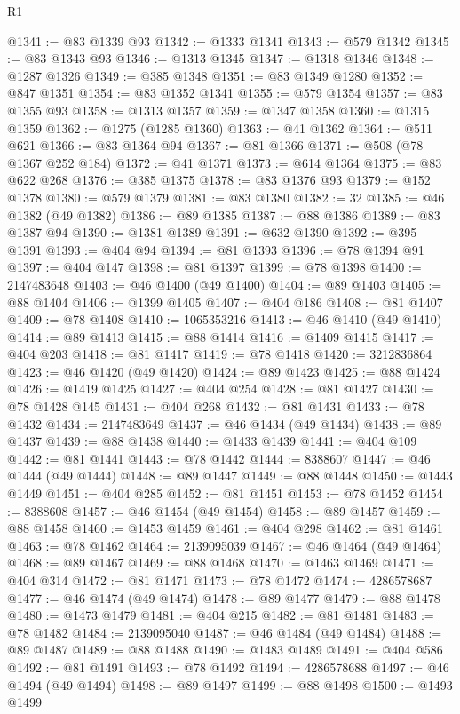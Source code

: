 \begin{lexlean}{R1}
\begin{coremodule}
@1341 := @83 @1339 @93
@1342 := @1333 @1341
@1343 := @579 @1342
@1345 := @83 @1343 @93
@1346 := @1313 @1345
@1347 := @1318 @1346
@1348 := @1287 @1326
@1349 := @385 @1348
@1351 := @83 @1349 @1280
@1352 := @847 @1351
@1354 := @83 @1352 @1341
@1355 := @579 @1354
@1357 := @83 @1355 @93
@1358 := @1313 @1357
@1359 := @1347 @1358
@1360 := @1315 @1359
@1362 := @1275 (@1285 @1360)
@1363 := @41 @1362
@1364 := @511 @621
@1366 := @83 @1364 @94
@1367 := @81 @1366
@1371 := @508 (@78 @1367 @252 @184)
@1372 := @41 @1371
@1373 := @614 @1364
@1375 := @83 @622 @268
@1376 := @385 @1375
@1378 := @83 @1376 @93
@1379 := @152 @1378
@1380 := @579 @1379
@1381 := @83 @1380
@1382 := 32
@1385 := @46 @1382 (@49 @1382)
@1386 := @89 @1385
@1387 := @88 @1386
@1389 := @83 @1387 @94
@1390 := @1381 @1389
@1391 := @632 @1390
@1392 := @395 @1391
@1393 := @404 @94
@1394 := @81 @1393
@1396 := @78 @1394 @91
@1397 := @404 @147
@1398 := @81 @1397
@1399 := @78 @1398
@1400 := 2147483648
@1403 := @46 @1400 (@49 @1400)
@1404 := @89 @1403
@1405 := @88 @1404
@1406 := @1399 @1405
@1407 := @404 @186
@1408 := @81 @1407
@1409 := @78 @1408
@1410 := 1065353216
@1413 := @46 @1410 (@49 @1410)
@1414 := @89 @1413
@1415 := @88 @1414
@1416 := @1409 @1415
@1417 := @404 @203
@1418 := @81 @1417
@1419 := @78 @1418
@1420 := 3212836864
@1423 := @46 @1420 (@49 @1420)
@1424 := @89 @1423
@1425 := @88 @1424
@1426 := @1419 @1425
@1427 := @404 @254
@1428 := @81 @1427
@1430 := @78 @1428 @145
@1431 := @404 @268
@1432 := @81 @1431
@1433 := @78 @1432
@1434 := 2147483649
@1437 := @46 @1434 (@49 @1434)
@1438 := @89 @1437
@1439 := @88 @1438
@1440 := @1433 @1439
@1441 := @404 @109
@1442 := @81 @1441
@1443 := @78 @1442
@1444 := 8388607
@1447 := @46 @1444 (@49 @1444)
@1448 := @89 @1447
@1449 := @88 @1448
@1450 := @1443 @1449
@1451 := @404 @285
@1452 := @81 @1451
@1453 := @78 @1452
@1454 := 8388608
@1457 := @46 @1454 (@49 @1454)
@1458 := @89 @1457
@1459 := @88 @1458
@1460 := @1453 @1459
@1461 := @404 @298
@1462 := @81 @1461
@1463 := @78 @1462
@1464 := 2139095039
@1467 := @46 @1464 (@49 @1464)
@1468 := @89 @1467
@1469 := @88 @1468
@1470 := @1463 @1469
@1471 := @404 @314
@1472 := @81 @1471
@1473 := @78 @1472
@1474 := 4286578687
@1477 := @46 @1474 (@49 @1474)
@1478 := @89 @1477
@1479 := @88 @1478
@1480 := @1473 @1479
@1481 := @404 @215
@1482 := @81 @1481
@1483 := @78 @1482
@1484 := 2139095040
@1487 := @46 @1484 (@49 @1484)
@1488 := @89 @1487
@1489 := @88 @1488
@1490 := @1483 @1489
@1491 := @404 @586
@1492 := @81 @1491
@1493 := @78 @1492
@1494 := 4286578688
@1497 := @46 @1494 (@49 @1494)
@1498 := @89 @1497
@1499 := @88 @1498
@1500 := @1493 @1499

\end{coremodule}
\end{lexlean}
